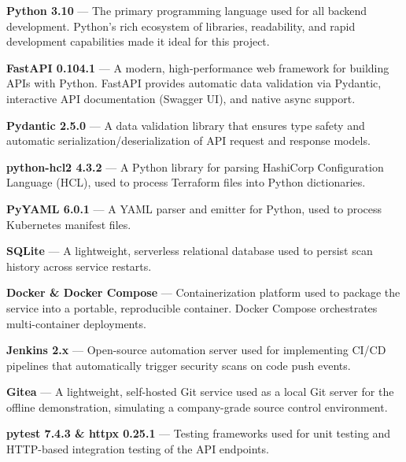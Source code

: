 \noindent\textbf{Python 3.10} — The primary programming language used for all backend development. Python's rich ecosystem of libraries, readability, and rapid development capabilities made it ideal for this project.

\vspace{0.2cm}
\noindent\textbf{FastAPI 0.104.1} — A modern, high-performance web framework for building APIs with Python. FastAPI provides automatic data validation via Pydantic, interactive API documentation (Swagger UI), and native async support.

\vspace{0.2cm}
\noindent\textbf{Pydantic 2.5.0} — A data validation library that ensures type safety and automatic serialization/deserialization of API request and response models.

\vspace{0.2cm}
\noindent\textbf{python-hcl2 4.3.2} — A Python library for parsing HashiCorp Configuration Language (HCL), used to process Terraform files into Python dictionaries.

\vspace{0.2cm}
\noindent\textbf{PyYAML 6.0.1} — A YAML parser and emitter for Python, used to process Kubernetes manifest files.

\vspace{0.2cm}
\noindent\textbf{SQLite} — A lightweight, serverless relational database used to persist scan history across service restarts.

\vspace{0.2cm}
\noindent\textbf{Docker \& Docker Compose} \cite{docker} — Containerization platform used to package the service into a portable, reproducible container. Docker Compose orchestrates multi-container deployments.

\vspace{0.2cm}
\noindent\textbf{Jenkins 2.x} \cite{jenkins} — Open-source automation server used for implementing CI/CD pipelines that automatically trigger security scans on code push events.

\vspace{0.2cm}
\noindent\textbf{Gitea} — A lightweight, self-hosted Git service used as a local Git server for the offline demonstration, simulating a company-grade source control environment.

\vspace{0.2cm}
\noindent\textbf{pytest 7.4.3 \& httpx 0.25.1} — Testing frameworks used for unit testing and HTTP-based integration testing of the API endpoints.

